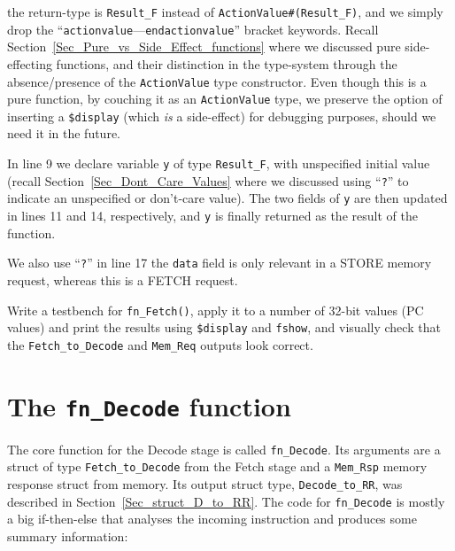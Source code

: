 {\ie} the return-type is \verb|Result_F| instead of
\verb|ActionValue#(Result_F)|, and we simply drop the
``\verb|actionvalue|---\verb|endactionvalue|'' bracket
keywords. Recall Section~\ref{Sec_Pure_vs_Side_Effect_functions} where
we discussed pure {\vs} side-effecting functions, and their
distinction in the type-system through the absence/presence of the
\verb|ActionValue| type constructor.  Even though this is a pure
function, by couching it as an \verb|ActionValue| type, we preserve
the option of inserting a \verb|$display| (which \emph{is} a
side-effect) for debugging purposes, should we need it in the future.

In line 9 we declare variable \verb|y| of type \verb|Result_F|, with
unspecified initial value (recall Section~\ref{Sec_Dont_Care_Values}
where we discussed using ``\verb|?|'' to indicate an unspecified or
don't-care value).  The two fields of \verb|y| are then updated in
lines 11 and 14, respectively, and \verb|y| is finally returned as the
result of the function.

We also use ``\verb|?|'' in line 17 the \verb|data| field is only
relevant in a STORE memory request, whereas this is a FETCH request.


\hdivider

\Exercise

Write a testbench for \verb|fn_Fetch()|, apply it to a number of
32-bit values (PC values) and print the results using \verb|$display|
and \verb|fshow|, and visually check that the \verb|Fetch_to_Decode|
and \verb|Mem_Req| outputs look correct.

\Endexercise


\section{The {\tt fn\_Decode} function}

\label{Sec_fn_Decode}


The core function for the Decode stage is called \verb|fn_Decode|.
Its arguments are a struct of type \verb|Fetch_to_Decode| from the
Fetch stage and a \verb|Mem_Rsp| memory response struct from memory.
Its output struct type, \verb|Decode_to_RR|, was described in
Section~\ref{Sec_struct_D_to_RR}.  The code for \verb|fn_Decode| is
mostly a big if-then-else that analyses the incoming instruction and
produces some summary information:

